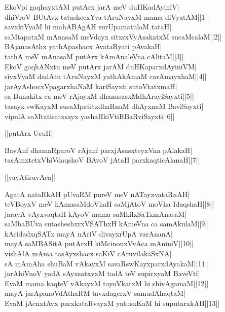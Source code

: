 \documentclass{article}
\begin{document}
EkoVpi gaqhayxtAM putArx jarA meV duHKadAyiniV|\\
dhiVroV BUtAvx tatashecxYva tAruNayxM mama diVyatAM||1||\\
savxkiVyaM hi mahABAgAH surUpamatulaM tataH|\\
saMtapatxM mAnasaM meVdayx sitxrxVyAsakatxM sucaMcalaM||2||\\
BAjanasAthx yathApashacx AvataRyati pAvakaH|\\
tathA meV mAnasaM putArx kAmAnaleVna cAlitaM||3||\\
EkoV gaqhANxtu meV putArx jarAM duHKaparxdAyiniVM|\\
sivxVyaM dadAtu tAruNayxM yathAkAmaM carAmayxhaM||4||\\
jarAyAshocxVpagarxhaNaM kariSayxti sutoVtatxmaH|\\
sa Bunakitx ca meV rAjayxM dhanusasxMdhArayiSayxti||5||\\
tasayx swKayxM susaMpatitxdhaRnaM dhAyxnaM BaviSayxti|\\
vipulA saMtatisatxsayx yashaHkiVtiRBaRviSayxti||6||\\

\begin{center}
||putArx UcuH||
\end{center}

BavAnf dhamaRparoV rAjanf parxjAsasxteyxVna pAlakaH|\\
tasAmxtetxVhiVdaqshoV BAvoV jAtaH parxkaqticAlanaH||7||\\

\begin{center}
||yayAtiruvAca||
\end{center}

AgatA nataRkAH pUvaRM pureV meV nATayxvataRnAH|\\
teVBoyxV meV kAmasaMdoVhaH saMjAtoV moVha IdaqshaH||8||\\
jarayA vAyxvaqtaH kAyoV mama saMkilxSaTxmAnasaM|\\
saMbaBUva sutasheshxrxVSAThxH kAmeVna ca samAkulaM||9||\\
kAcidadxqSATx mayA nAriV divayxrUpA varAnanA|\\
mayA saMBASitA putArxH kiMcinonxVvAca mAniniV||10||\\
vishAlA mAma tasAyxshacx saKiV cAruvilakaSxNA|\\
sA mAmAha shuBaM vAkayxM savaRswKayxparxdAyakaM||11||\\
jarAhiVnoV yadA sAyxsatxvxM tadA teV supirxyaM BaveVtf|\\
EvaM mama kaqteV vAkayxM tayoVkatxM hi shivAgamaM||12||\\
mayA jarApanoVdAthaRM tavxdagerxV samudAhaqtaM|\\
EvaM jAcnxtAvx parxkataRvayxM yatusxKaM hi suputarxkAH||13||\\
\end{document}
